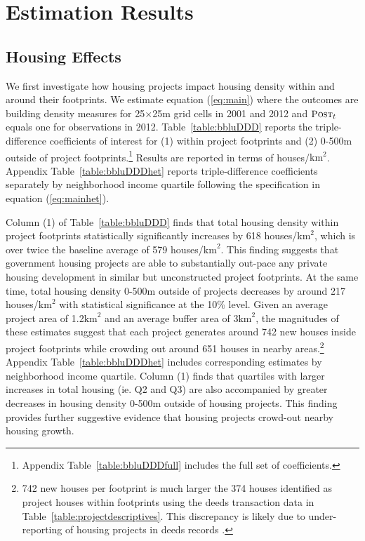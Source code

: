 \documentclass[12pt]{article}
\begin{document}
\section{Estimation Results}\label{section:results}




\subsection{Housing Effects}\label{section:bbluestimates}

We first investigate how housing projects impact housing density within and around their footprints.  We estimate equation (\ref{eq:main}) where the outcomes are building density measures for 25$\times$25m grid cells in 2001 and 2012 and $\textsc{\small Post}_{t}$ equals one for observations in 2012.  Table~\ref{table:bbluDDD} reports the triple-difference coefficients of interest for (1) within project footprints and (2) 0-500m outside of project footprints.\footnote{Appendix Table~\ref{table:bbluDDDfull} includes the full set of coefficients.}  Results are reported in terms of houses/$\text{km}^{2}$.  Appendix Table~\ref{table:bbluDDDhet} reports triple-difference coefficients separately by neighborhood income quartile following the specification in equation (\ref{eq:mainhet}).  

Column (1)  of Table~\ref{table:bbluDDD} finds that total housing density within project footprints statistically significantly increases by 618 houses/$\text{km}^{2}$, which is over twice the baseline average of 579 houses/$\text{km}^{2}$.  This finding suggests that government housing projects are able to substantially out-pace any private housing development in similar but unconstructed project footprints.  At the same time, total housing density 0-500m outside of projects decreases by around 217 houses/$\text{km}^{2}$ with statistical significance at the 10\% level.  Given an average project area of 1.2$\text{km}^{2}$ and an average buffer area of 3$\text{km}^{2}$, the magnitudes of these estimates suggest that each project generates around 742 new houses inside project footprints while crowding out around 651 houses in nearby areas.\footnote{742 new houses per footprint is much larger the 374 houses identified as project houses within footprints using the deeds transaction data in Table~\ref{table:projectdescriptives}.  This discrepancy is likely due to under-reporting of housing projects in deeds records \citep{seriq}.}  Appendix Table~\ref{table:bbluDDDhet} includes corresponding estimates by neighborhood income quartile.  Column (1) finds that quartiles with larger increases in total housing (ie. Q2 and Q3) are also accompanied by greater decreases in housing density 0-500m outside of housing projects.  This finding provides further suggestive evidence that housing projects crowd-out nearby housing growth.
\end{document}
